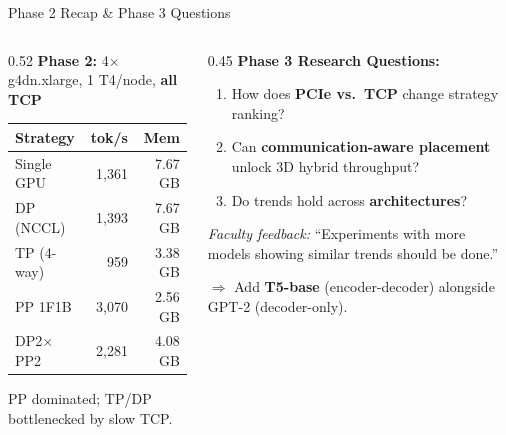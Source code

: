 \documentclass[10pt, aspectratio=169]{beamer}
\begin{document}
\begin{frame}{Phase 2 Recap \& Phase 3 Questions}
  \begin{columns}[T]
  \begin{column}{0.52\textwidth}
    \textbf{Phase 2:} 4$\times$ g4dn.xlarge, 1 T4/node, \textbf{all TCP}
    \vspace{0.2em}

    \centering
    \small
    \begin{tabular}{lrr}
      \toprule
      \textbf{Strategy} & \textbf{tok/s} & \textbf{Mem} \\
      \midrule
      Single GPU & 1,361 & 7.67 GB \\
      DP (NCCL) & 1,393 & 7.67 GB \\
      TP (4-way) & 959 & 3.38 GB \\
      PP 1F1B & 3,070 & 2.56 GB \\
      DP2$\times$PP2 & 2,281 & 4.08 GB \\
      \bottomrule
    \end{tabular}

    \vspace{0.3em}
    \raggedright
    \small PP dominated; TP/DP bottlenecked by slow TCP.
  \end{column}
  \begin{column}{0.45\textwidth}
    \textbf{Phase 3 Research Questions:}
    \begin{enumerate}
      \item How does \textbf{PCIe vs.\ TCP} change strategy ranking?
      \item Can \textbf{communication-aware placement} unlock 3D hybrid throughput?
      \item Do trends hold across \textbf{architectures}?
    \end{enumerate}

    \vspace{0.5em}
    \small
    \textit{Faculty feedback:} ``Experiments with more models showing similar trends should be done.''

    \vspace{0.3em}
    $\Rightarrow$ Add \textbf{T5-base} (encoder-decoder) alongside GPT-2 (decoder-only).
  \end{column}
  \end{columns}
\end{frame}

\end{document}
